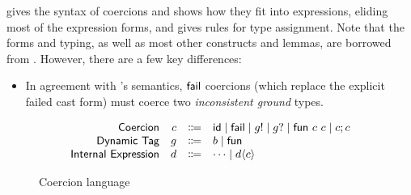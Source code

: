 \documentclass[index.tex]{subfiles}
\begin{document}
 gives the syntax of coercions and shows how they fit into expressions,
eliding most of the expression forms, and  gives rules for type
assignment. Note that the forms and typing, as well as most other constructs and lemmas, are
borrowed from \textcite{herman2010}. However, there are a few key differences:
%
\begin{itemize}
  \item In agreement with \HazelnutLive's semantics, $\textsf{fail}$ coercions (which replace the explicit
    failed cast form) must coerce two \emph{inconsistent ground} types.
\end{itemize}

\begin{figure}[htb!]
  \[\begin{array}{rrcl}
    \textsf{Coercion}  & c  & \Coloneqq & \textsf{id} \mid \textsf{fail}
                                 \mid g! \mid g? 
                                 \mid \textsf{fun} ~c ~c \mid c; c \\
    \textsf{Dynamic Tag} & g & \Coloneqq & b \mid \textsf{fun} \\
    \textsf{Internal Expression} & d & \Coloneqq & \cdots \mid d \langle c \rangle
  \end{array}\]
  \caption{Coercion language}
  \label{fig:coercion-syntax}
\end{figure}
\end{document}

